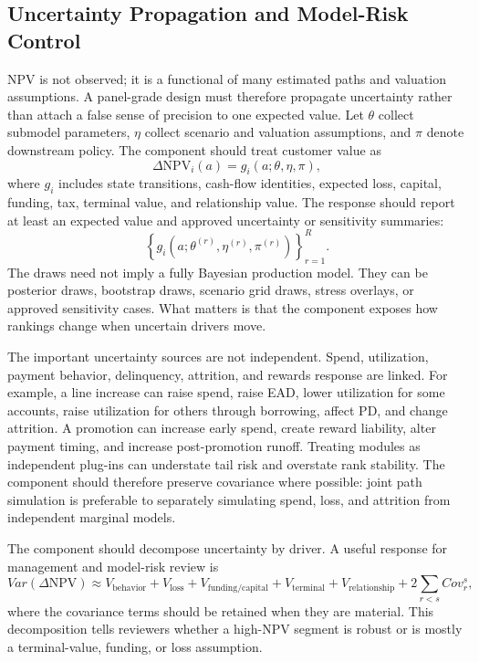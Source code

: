 \documentclass[11pt]{article}
\newcommand{\NPV}{\mathrm{NPV}}
\newcommand{\1}{\mathbf{1}}
\begin{document}
\subsection{Uncertainty Propagation and Model-Risk Control}
\label{sec:uncertainty-propagation}

NPV is not observed; it is a functional of many estimated paths and valuation
assumptions. A panel-grade design must therefore propagate uncertainty rather
than attach a false sense of precision to one expected value. Let $\theta$
collect submodel parameters, $\eta$ collect scenario and valuation assumptions,
and $\pi$ denote downstream policy. The component should treat customer value
as
\begin{equation}
  \Delta \NPV_i(a)
  =
  g_i(a;\theta,\eta,\pi),
  \label{eq:npv-functional-uncertainty}
\end{equation}
where $g_i$ includes state transitions, cash-flow identities, expected loss,
capital, funding, tax, terminal value, and relationship value. The response
should report at least an expected value and approved uncertainty or
sensitivity summaries:
\begin{equation}
  \left\{
    g_i(a;\theta^{(r)},\eta^{(r)},\pi^{(r)})
  \right\}_{r=1}^{R}.
  \label{eq:npv-draws}
\end{equation}
The draws need not imply a fully Bayesian production model. They can be
posterior draws, bootstrap draws, scenario grid draws, stress overlays, or
approved sensitivity cases. What matters is that the component exposes how
rankings change when uncertain drivers move.

The important uncertainty sources are not independent. Spend, utilization,
payment behavior, delinquency, attrition, and rewards response are linked.
For example, a line increase can raise spend, raise EAD, lower utilization for
some accounts, raise utilization for others through borrowing, affect PD, and
change attrition. A promotion can increase early spend, create reward
liability, alter payment timing, and increase post-promotion runoff. Treating
modules as independent plug-ins can understate tail risk and overstate rank
stability. The component should therefore preserve covariance where possible:
joint path simulation is preferable to separately simulating spend, loss, and
attrition from independent marginal models.

The component should decompose uncertainty by driver. A useful response for
management and model-risk review is
\[
  Var(\Delta \NPV)
  \approx
  V_{\mathrm{behavior}}
  +V_{\mathrm{loss}}
  +V_{\mathrm{funding/capital}}
  +V_{\mathrm{terminal}}
  +V_{\mathrm{relationship}}
  +2\sum_{r<s}Cov_r^s,
\]
where the covariance terms should be retained when they are material. This
decomposition tells reviewers whether a high-NPV segment is robust or is
mostly a terminal-value, funding, or loss assumption.
\end{document}
